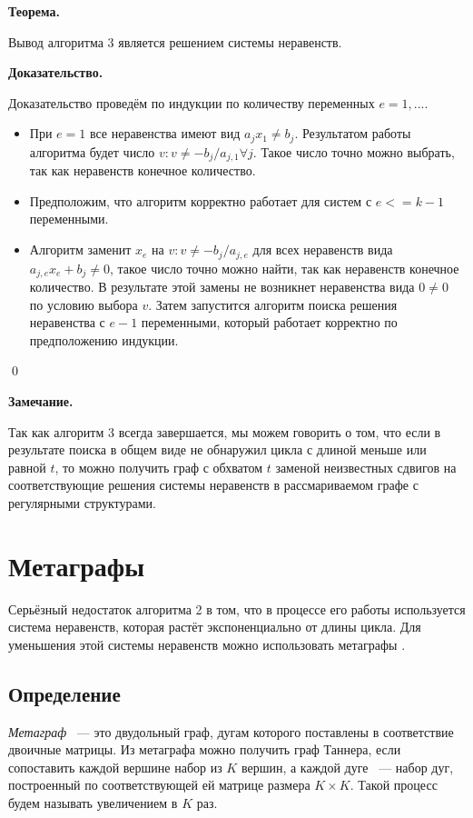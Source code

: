 \documentclass[14pt]{mmcs-article}
\begin{document}
\textbf{Теорема.}

Вывод алгоритма 3 является решением системы неравенств.

\textbf{Доказательство.}

Доказательство проведём по индукции по количеству переменных $e = 1, ...$.

\begin{itemize}
\item При $e = 1$ все неравенства имеют вид $a_j x_1 \neq b_j$. Результатом работы алгоритма будет число $v: v \neq -b_{j}/a_{j, 1} \forall j$. Такое число точно можно выбрать, так как неравенств конечное количество.
\item Предположим, что алгоритм корректно работает для систем с $e <= k - 1$ переменными.
\item Алгоритм заменит $x_e$ на $v: v \neq -b_{j}/a_{j, e}$ для всех неравенств вида $a_{j, e} x_e + b_j \neq 0$, такое число точно можно найти, так как неравенств конечное количество. В результате этой замены не возникнет неравенства вида $0 \neq 0$ по условию выбора $v$. Затем запустится алгоритм поиска решения неравенства с $e - 1$ переменными, который работает корректно по предположению индукции. 
\end{itemize}

\qed

\textbf{Замечание.}

Так как алгоритм 3 всегда завершается, мы можем говорить о том, что если в результате поиска в общем виде не обнаружил цикла с длиной меньше или равной $t$, то можно получить граф с обхватом $t$ заменой неизвестных сдвигов на соответствующие решения системы неравенств в рассмариваемом графе с регулярными структурами.

\newpage
\section{Метаграфы}

Серьёзный недостаток алгоритма 2 в том, что в процессе его работы используется система неравенств, которая растёт экспоненциально от длины цикла. Для уменьшения этой системы неравенств можно использовать метаграфы \cite{metagraphs}.

\subsection{Определение}

\textsl{Метаграф} ~--- это двудольный граф, дугам которого поставлены в соответствие двоичные матрицы. Из метаграфа можно получить граф Таннера, если сопоставить каждой вершине набор из $K$ вершин, а каждой дуге ~--- набор дуг, построенный по соответствующей ей матрице размера $K \times K$. Такой процесс будем называть увеличением в $K$ раз. 
\end{document}
